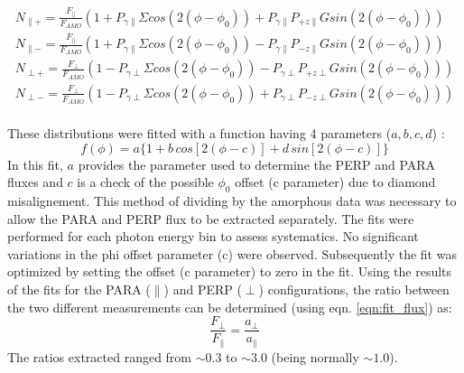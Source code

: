 \begin{eqnarray}
N_{\parallel +} = \frac{F_{\parallel}}{F_{AMO}} \left( 1 + P_{\gamma \parallel}\Sigma cos(2(\phi-\phi_0)) + P_{\gamma \parallel} P_{+z\parallel} G sin(2(\phi-\phi_0)) \right) \label{eq:N1}\\
N_{\parallel -} = \frac{F_{\parallel}}{F_{AMO}} \left( 1 + P_{\gamma \parallel}\Sigma cos(2(\phi-\phi_0)) - P_{\gamma \parallel} P_{-z\parallel} G sin(2(\phi-\phi_0)) \right) \label{eq:N2}\\
N_{\perp +} = \frac{F_{\perp}}{F_{AMO}} \left( 1 - P_{\gamma \perp}\Sigma cos(2(\phi-\phi_0)) - P_{\gamma \perp} P_{+z\perp} G sin(2(\phi-\phi_0)) \right) \label{eq:N3}\\
N_{\perp -} = \frac{F_{\perp}}{F_{AMO}} \left( 1 - P_{\gamma \perp}\Sigma cos(2(\phi-\phi_0)) + P_{\gamma \perp} P_{-z\perp} G sin(2(\phi-\phi_0)) \right) \label{eq:N4}\\
\end{eqnarray}


These distributions were fitted with a function having 4 parameters ($ a,b,c,d $) :
\begin{equation} \label{eqn:fit_flux}
f(\phi) = a \{ 1 + b\, cos[2 (\phi - c) ]  + d\, sin[2(\phi - c)] \} 
\end{equation}
In this fit, $a$ provides the parameter used to determine the PERP and PARA fluxes and $c$ is a check of the possible $\phi_0$ offset (c parameter) due to diamond misalignement.
This method of dividing by the amorphous data was necessary to allow the PARA and PERP flux to be extracted separately. The fits were performed for each photon energy bin to assess systematics. No significant variations in the phi offset parameter (c) were observed. Subsequently the fit was optimized by setting the offset (c parameter) to zero in the fit. 
Using the results of the fits for the PARA ($\parallel$) and PERP ($\perp$) configurations, the ratio between the two different measurements can be determined (using eqn. \ref{eqn:fit_flux}) as:
\begin{equation}
\frac{F_{\perp}}{F_{\parallel}} = \frac{a_{\perp}}{a_{\parallel}}
\end{equation}
The ratios extracted ranged from $\sim 0.3$ to $\sim 3.0$ (being normally $\sim 1.0$).


